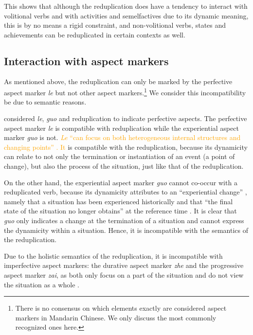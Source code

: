 \documentclass[11pt,a4paper,fleqn,draft]{article}
\newcommand{\changed}[1]{\textcolor{orange}{#1}}
\begin{document}
This shows that although the reduplication does have a tendency to interact with volitional verbs and with activities and semelfactives due to its dynamic meaning, 
this is by no means a rigid constraint, 
and non\hyp{}volitional verbs, states and achievements can be reduplicated in certain contexts as well.




\subsection{Interaction with aspect markers}\label{sec:aspM}

As mentioned above, the reduplication can only be marked by the perfective aspect marker \emph{le} but not other aspect markers.\footnote{
There is no consensus on which elements exactly are considered aspect markers in Mandarin Chinese. We only discuss the most commonly recognized ones here.
}
We consider this incompatibility be due to semantic reasons.

\citet[Ch. 4]{XiaoMcEnery2004} considered \emph{le}, \emph{guo} and reduplication to indicate perfective aspects.
The perfective aspect marker \emph{le} is compatible with reduplication while the experiential aspect marker \emph{guo} is not.
\changed{\emph{Le} ``can focus on both heterogeneous internal structures and changing points'' \citep[129]{XiaoMcEnery2004}.
It} is compatible with the reduplication, because its dynamicity can relate to not only the termination or instantiation of an event (a point of change), but also the process of the situation, just like that of the reduplication.

On the other hand, the experiential aspect marker \emph{guo} cannot co\hyp{}occur with a reduplicated verb, 
because its dynamicity attributes to an ``experiential change'' \citep[148]{XiaoMcEnery2004}, 
namely that a situation has been experienced historically and that ``the final state of the situation no longer obtains'' at the reference time \citep[144]{XiaoMcEnery2004}. 
It is clear that \emph{guo} only indicates a change at the termination of a situation and cannot express the dynamicity within a situation.
Hence, it is incompatible with the semantics of the reduplication.

Due to the holistic semantics of the reduplication, it is incompatible with imperfective aspect markers: the durative aspect marker \emph{zhe} and the progressive aspect marker \emph{zai}, as both only focus on  a part of the situation and do not view the situation as a whole \citep[Ch. 5]{XiaoMcEnery2004}.
\end{document}

